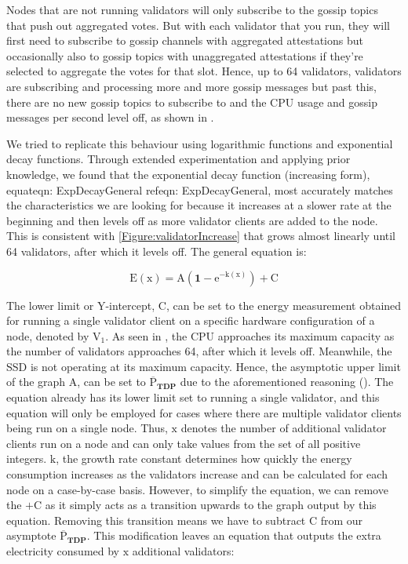 Nodes that are not running validators will only subscribe to the gossip topics that push out aggregated votes. But with each validator that you run, they will first need to subscribe to gossip channels with aggregated attestations but occasionally also to gossip topics with unaggregated attestations if they're selected to aggregate the votes for that slot. Hence, up to 64 validators, validators are subscribing and processing more and more gossip messages but past this, there are no new gossip topics to subscribe to and the CPU usage and gossip messages per second level off, as shown in .

We tried to replicate this behaviour using logarithmic functions and exponential decay functions. Through extended experimentation and applying prior knowledge, we found that the exponential decay function (increasing form), equat{eqn: ExpDecayGeneral} ref{eqn: ExpDecayGeneral}, most accurately matches the characteristics we are looking for because it increases at a slower rate at the beginning and then levels off as more validator clients are added to the node. This is consistent with \ref{Figure:validatorIncrease} that grows almost linearly until 64 validators, after which it levels off. The general equation is:

\begin{equation}
    \label{eqn: ExpDecayGeneral}
    \boldsymbol{\mathrm{E(\mathrm{x})} = \mathrm{A} (1-\mathrm{e}^{-\mathrm{k}(\mathrm{x})}) + \mathrm{C}}
\end{equation}

The lower limit or Y-intercept, $\boldsymbol{\mathrm{C}}$, can be set to the energy measurement obtained for running a single validator client on a specific hardware configuration of a node, denoted by $\boldsymbol{\mathrm{V_{1}}}$. As seen in , the CPU approaches its maximum capacity as the number of validators approaches 64, after which it levels off. Meanwhile, the SSD is not operating at its maximum capacity. Hence, the asymptotic upper limit of the graph $\boldsymbol{\mathrm{A}}$, can be set to $\boldsymbol{\mathrm{\overline{P}}_{TDP}}$ due to the aforementioned reasoning (). The equation already has its lower limit set to running a single validator, and this equation will only be employed for cases where there are multiple validator clients being run on a single node. Thus, $\boldsymbol{\mathrm{x}}$ denotes the number of additional validator clients run on a node and can only take values from the set of all positive integers.  $\boldsymbol{\mathrm{k}}$, the growth rate constant determines how quickly the energy consumption increases as the validators increase and can be calculated for each node on a case-by-case basis. However, to simplify the equation, we can remove the $\boldsymbol{ + \mathrm{C}}$ as it simply acts as a transition upwards to the graph output by this equation. Removing this transition means we have to subtract $\boldsymbol{ \mathrm{C}}$ from our asymptote $\boldsymbol{\mathrm{\overline{P}}_{TDP}}$. This modification leaves an equation that outputs the extra electricity consumed by $\boldsymbol{\mathrm{x}}$ additional validators:

